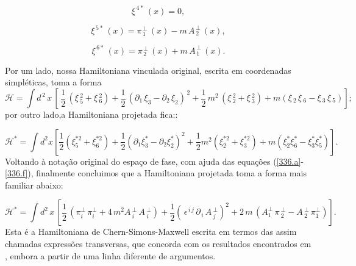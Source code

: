 \documentclass[a4paper,thmsa,12pt]{report}
\begin{document}
\begin{equation}
\xi ^{\,4\ast }\,\left( x\right) =0,  \label{336.d}
\end{equation}

\begin{equation}
\xi ^{\,5\ast }\,\left( x\right) =\pi _{\,1}^{\,\perp }\,\left( x\right)
-m\,A_{\,2}^{\,\perp }\,\left( x\right) ,  \label{336.e}
\end{equation}

\begin{equation}
\xi ^{\,6\ast }\,\left( x\right) =\pi _{\,2}^{\,\perp }\,\left( x\right)
+m\,A_{\,1}^{\,\perp }\,\left( x\right) .  \label{336.f}
\end{equation}
\medskip

Por um lado, nossa Hamiltoniana vinculada original, escrita em coordenadas
simpl\'{e}ticas, toma a forma
\begin{equation}
\mathcal{H}=\int d^{\,2}\,x\,\left[ \,\frac{1}{2}\,\left( \xi \,_{5}^{2}+\xi
\,_{6}^{2}\right) +\frac{1}{2}\,\left( \partial _{1}\,\xi _{3}-\partial
_{2}\,\xi _{2}\right) ^{\,2}+\frac{1}{2}\,m^{2}\,\left( \xi \,_{2}^{2}+\xi
\,_{3}^{2}\right) +m\left( \xi \,_{2}\,\xi \,_{6}-\xi \,_{3}\,\xi
\,_{5}\right) \right] ;  \label{337}
\end{equation}
por outro lado,a Hamiltoniana projetada fica::

\begin{equation}
\mathcal{H}^{\ast }=\int d^{2}x\left[ \frac{1}{2}\left( \xi _{5}^{\ast
2}+\xi _{6}^{\ast 2}\right) +\frac{1}{2}\left( \partial _{1}\xi _{3}^{\ast
}-\partial _{2}\xi _{2}^{\ast }\right) ^{2}+\frac{1}{2}m^{2}\left( \xi
_{2}^{\ast 2}+\xi _{3}^{\ast 2}\right) +m\left( \xi _{2}^{\ast }\xi
_{6}^{\ast }-\xi _{3}^{\ast }\xi _{5}^{\ast }\right) \right] .  \label{338}
\end{equation}
\medskip Voltando \`{a} nota\c{c}\~{a}o original do espa\c{c}o de fase, com
ajuda das equa\c{c}\~{o}es (\ref{336.a}-\ref{336.f}), finalmente concluimos
que a Hamiltoniana projetada toma a forma mais familiar abaixo:

\begin{equation}
\mathcal{H}^{\ast }=\int d^{2}\,x\,\left[ \frac{1}{2}\,\left( \pi
_{i}^{\perp }\,\pi _{i}^{\perp }+4\,m^{2}A\,_{i}^{\perp }\,A\,_{i}^{\perp
}\right) +\frac{1}{2}\left( \,\epsilon ^{\,i\,j}\,\partial
_{\,i}\,A\,_{j}^{\perp }\right) ^{2}+2\,m\,\left( A_{1}^{\perp }\,\pi
\,_{2}^{\perp }-A\,_{2}^{\perp }\,\pi _{1}^{\perp }\right) \right] .
\label{339}
\end{equation}
\smallskip Esta \'{e} a Hamiltoniana de Chern-Simons-Maxwell escrita em
termos das assim chamadas express\~{o}es transversas, que concorda com os
resultados encontrados em \cite{devecchi} , embora a partir de uma linha
diferente de argumentos.\smallskip 
\end{document}

